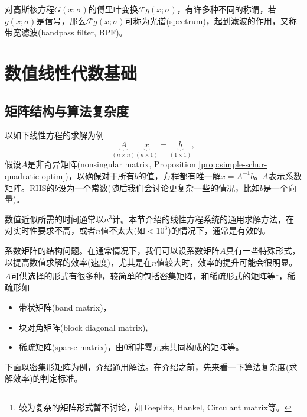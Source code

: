 \begin{subappendices}
对高斯核方程$G(x;\sigma)$的傅里叶变换$\mathcal{F} g(x;\sigma)$，有许多种不同的称谓，若$g(x;\sigma)$是信号，那么$\mathcal{F} g(x;\sigma)$可称为光谱(spectrum)，起到滤波的作用，又称带宽滤波(bandpass filter, BPF)。



\section{数值线性代数基础}
\label{sec:numlin}

\subsection{矩阵结构与算法复杂度}
\label{sec:numlin-matrix-structure-algorithm-complexity}

以如下线性方程的求解为例
\begin{equation}
  \label{eq:numlin-matrix-example}
  \underbrace{A}_{\left(n \times n \right)}
  \underbrace{x}_{\left( n \times 1 \right)}
  = \underbrace{b}_{\left( 1 \times 1 \right)},
\end{equation}
假设$A$是非奇异矩阵(nonsingular matrix, Proposition \ref{prop:simple-schur-quadratic-optim})，以确保对于所有$b$的值，方程都有唯一解$x = A^{-1} b$。$A$表示系数矩阵。RHS的$b$设为一个常数(随后我们会讨论更复杂一些的情况，比如$b$是一个向量)。

数值近似所需的时间通常以$n^{3}$计。本节介绍的线性方程系统的通用求解方法，在对实时性要求不高，或者$n$值不太大(如$<10^{3}$)的情况下，通常是有效的。

系数矩阵的结构问题。在通常情况下，我们可以设系数矩阵$A$具有一些特殊形式，以提高数值求解的效率(速度)，尤其是在$n$值较大时，效率的提升可能会很明显。$A$可供选择的形式有很多种，较简单的包括密集矩阵，和稀疏形式的矩阵等\footnote{较为复杂的矩阵形式暂不讨论，如Toeplitz, Hankel, Circulant matrix等。}，稀疏形如
\begin{itemize}
  \item 带状矩阵(band matrix)，
  \item 块对角矩阵(block diagonal matrix),
  \item 稀疏矩阵(sparse matrix)，由$0$和非零元素共同构成的矩阵等。
\end{itemize}

下面以密集形矩阵为例，介绍通用解法。在介绍之前，先来看一下算法复杂度(求解效率)的判定标准。


\end{subappendices}
